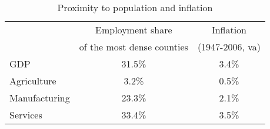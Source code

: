 \documentclass[12pt]{article}
\begin{document}
\begin{table}[h!]
\center
\caption{Proximity to population and inflation} \label{tab:infl}
\begin{tabular}{l|cc}
\hline\hline
& Employment share & Inflation \\
& of the most dense counties & (1947-2006, va)\\ \hline
GDP & 31.5\% & 3.4\% \\ \hline
Agriculture & 3.2\% & 0.5\% \\
Manufacturing & 23.3\% & 2.1\% \\
Services & 33.4\% & 3.5\% \\ \hline\hline
\end{tabular}
\end{table}
\end{document}
